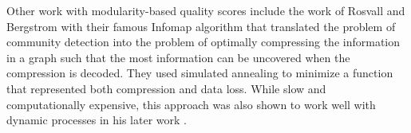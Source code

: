 \documentclass{report}
\begin{document}
	Other work with modularity-based quality scores include the work of Rosvall and Bergstrom with their famous Infomap algorithm \cite{rosvall2007information} that translated the problem of community detection into the problem of optimally compressing the information in a graph such that the most information can be uncovered when the compression is decoded. 
	They used simulated annealing to minimize a function that represented both compression and data loss. 
	While slow and computationally expensive, this approach was also shown to work well with dynamic processes in his later work \cite{rosvall2008maps}. 
	
	
	
\end{document}
